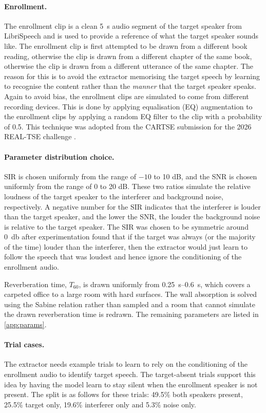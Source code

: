 \paragraph{Enrollment.} 
The enrollment clip is a clean \SI{5}{\second} audio segment of the target speaker from LibriSpeech and is used to provide a reference of what the target speaker sounds like. The enrollment clip is first attempted to be drawn from a different book reading, otherwise the clip is drawn from a different chapter of the same book, otherwise the clip is drawn from a different utterance of the same chapter. The reason for this is to avoid the extractor memorising the target speech by learning to recognise the content rather than the \emph{manner} that the target speaker speaks. Again to avoid bias, the enrollment clips are simulated to come from different recording devices. This is done by applying equalisation (EQ) augmentation to the enrollment clips by applying a random EQ filter to the clip with a probability of \num{0.5}. This technique was adopted from the CARTSE \cite{li2026cartse} submission for the 2026 REAL-TSE challenge \cite{wang2026realtse}.


\paragraph{Parameter distribution choice.}
SIR is chosen uniformly from the range of $-10$ to 10 dB, and the SNR is chosen uniformly from the range of 0 to 20 dB. These two ratios simulate the relative loudness of the target speaker to the interferer and background noise, respectively. A negative number for the SIR indicates that the interferer is louder than the target speaker, and the lower the SNR, the louder the background noise is relative to the target speaker. The SIR was chosen to be symmetric around \SI{0}{\decibel} after experimentation found that if the target was always (or the majority of the time) louder than the interferer, then the extractor would just learn to follow the speech that was loudest and hence ignore the conditioning of the enrollment audio. 

Reverberation time, $T_{60}$, is drawn uniformly from \SIrange{0.25}{0.6}{\second}, which covers a carpeted office to a large room with hard surfaces. The wall absorption is solved using the Sabine relation \cite{sabine1922} rather than sampled and a room that cannot simulate the drawn reverberation time is redrawn. The remaining parameters are listed in \autoref{app:params}.

\paragraph{Trial cases.} The extractor needs example trials to learn to rely on the conditioning of the enrollment audio to identify target speech. The target-absent trials support this idea by having the model learn to stay silent when the enrollment speaker is not present. The split is as follows for these trials: 49.5\% both speakers present, 25.5\% target only, 19.6\% interferer only and 5.3\% noise only.

